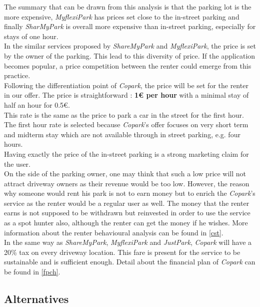 \documentclass[12pt,a4paper,oneside]{book}
\newcommand{\bp}{\textit{Copark}}
\begin{document}
The summary that can be drawn from this analysis is that the parking lot is the more expensive, \textit{MyflexiPark} has prices set close to the in-street parking and finally \textit{SharMyPark} is overall more expensive than in-street parking, especially for stays of one hour.\\

In the similar services proposed by \textit{ShareMyPark} and \textit{MyflexiPark}, the price is set by the owner of the parking. This lead to this diversity of price. If the application becomes popular, a price competition between the renter could emerge from this practice.\\

Following the differentiation point of \bp{}, the price will be set for the renter in our offer. The price is straightforward : \textbf{1\euro{} per hour} with a minimal stay of half an hour for 0.5\euro{}.\\

This rate is the same as the price to park a car in the street for the first hour. The first hour rate is selected because \bp{}'s offer focuses on very short term and midterm stay which are not available through in street parking, e.g. four hours.\\

Having exactly the price of the in-street parking is a strong marketing claim for the user.\\

On the side of the parking owner, one may think that such a low price will not attract driveway owners as their revenue would be too low. However, the reason why someone would rent his park is not to earn money but to enrich the \bp{}'s service as the renter would be a regular user as well. The money that the renter earns is not supposed to be withdrawn but reinvested in order to use the service as a spot hunter also, although the renter can get the money if he wishes. More information about the renter behavioural analysis can be found in \autoref{cst}.\\

In the same way as \textit{ShareMyPark}, \textit{MyflexiPark} and \textit{JustPark}, \bp{} will have a 20\% tax on every driveway location. This fare is present for the service to be sustainable and is sufficient enough. Detail about the financial plan of \bp{} can be found in \autoref{fpch}.\\

\subsection{Alternatives}
\end{document}

